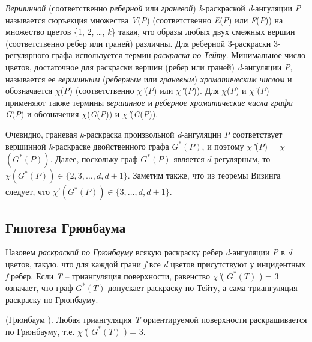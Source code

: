 \textit{Вершинной} (соответственно \textit{реберной} или \textit{граневой}) \textit{k}-раскраской \linebreak \textit{d}-ангуляции \textit{P} называется сюръекция множества \textit{V}(\textit{P}) (соответственно \textit{E}(\textit{P}) или \textit{F}(\textit{P})) на множество цветов \{1, 2, \dots , \textit{k}\} такая, что образы любых двух смежных вершин (соответственно ребер или граней) различны. Для реберной 3-раскраски 3-регулярного графа используется термин \textit{раскраска по Тейту}. Минимальное число цветов, достаточное для раскраски вершин (ребер или граней) \textit{d}-ангуляции \textit{P}, называется ее \textit{вершинным }(\textit{реберным} или \textit{граневым})\textit{ хроматическим числом} и обозначается \textit{$\chi $}(\textit{P}) (соответственно \textit{$\chi $'}(\textit{P}) или \textit{$\chi $"}(\textit{P})). Для \textit{$\chi $}(\textit{P}) и \textit{$\chi $'}(\textit{P}) применяют также термины \textit{вершинное} и \textit{реберное хроматические числа графа G}(\textit{P}) и обозначения \textit{$\chi $}(\textit{G}(\textit{P})) и \textit{$\chi $'}(\textit{G}(\textit{P})).

Очевидно, граневая \textit{k}-раскраска произвольной \textit{d}-ангуляции \textit{P} соответствует вершинной \textit{k}-раскраске двойственного графа $G^*(P)$, и поэтому \textit{$\chi $"}(\textit{P}) = \textit{$\chi $}$(G^*(P))$. Далее, поскольку граф $G^*(P)$ является $d$-регулярным, то $\chi (G^*(P)) \in  \{2, 3, \dots , d, d+1\}$. Заметим также, что из теоремы Визинга \cite{lit04} следует, что $\chi '(G^*(P)) \in  \{3, \dots , d, d+1\}$.

\subsection{Гипотеза Грюнбаума}

Назовем \textit{раскраской по Грюнбауму} всякую раскраску ребер \textit{d}-ангуляции \textit{P} в \textit{d} цветов, такую, что для каждой грани \textit{f} все \textit{d} цветов присутствуют у инцидентных \textit{f} ребер. Если \textit{T} -- триангуляция поверхности, равенство \textit{$\chi $'}( $G^*(T)$ ) = 3 означает, что граф  $G^*(T)$  допускает раскраску по Тейту, а сама триангуляция -- раскраску по Грюнбауму.

\begin{hypothesis}
\label{akm2.hypo1}
(Грюнбаум \cite{grunb1}). Любая триангуляция \textit{T} ориентируемой поверхности раскрашивается по Грюнбауму, т.е. \textit{$\chi $'}( $G^*(T)$ ) = 3.
\end{hypothesis}

